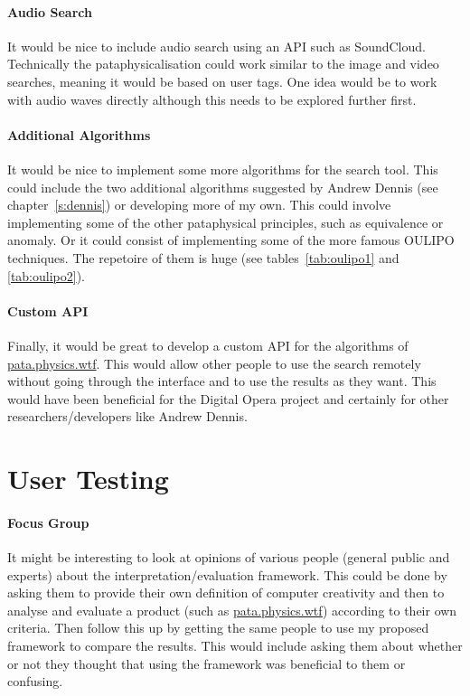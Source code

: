 \paragraph{Audio Search} 
It would be nice to include audio search using an \ac{API} such as SoundCloud. Technically the pataphysicalisation could work similar to the image and video searches, meaning it would be based on user tags. One idea would be to work with audio waves directly although this needs to be explored further first.

\paragraph{Additional Algorithms} 
It would be nice to implement some more algorithms for the search tool. This could include the two additional algorithms suggested by Andrew Dennis (see chapter~\ref{s:dennis}) or developing more of my own. This could involve implementing some of the other pataphysical principles, such as equivalence or anomaly. Or it could consist of implementing some of the more famous \ac{OULIPO} techniques. The repetoire of them is huge (see tables~\ref{tab:oulipo1} and \ref{tab:oulipo2}).

\paragraph{Custom API}
Finally, it would be great to develop a custom \ac{API} for the algorithms of \url{pata.physics.wtf}. This would allow other people to use the search remotely without going through the interface and to use the results as they want. This would have been beneficial for the Digital Opera project and certainly for other researchers/developers like Andrew Dennis.


\section{User Testing}

\paragraph{Focus Group}
It might be interesting to look at opinions of various people (general public and experts) about the interpretation/evaluation framework. This could be done by asking them to provide their own definition of computer creativity and then to analyse and evaluate a product (such as \url{pata.physics.wtf}) according to their own criteria. Then follow this up by getting the same people to use my proposed framework to compare the results. This would include asking them about whether or not they thought that using the framework was beneficial to them or confusing.

